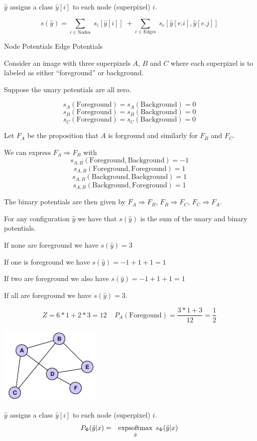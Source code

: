 {$\hat{y} $ assigns a class $\hat{y}[i]$ to each node (superpixel) $i$.


$$s(\hat{y}) = \sum_{i \in \mathrm{Nodes}}\; s_i[\hat{y}[i]]\; + \sum_{e \in \mathrm{Edges}}\;s_e[\hat{y}[e.i],\hat{y}[e.j]]$$

\vfill
\centerline{Node Potentials \hspace{4em}Edge Potentials}


Consider an image with three superpixels $A$, $B$ and $C$ where
each superpixel is to labeled as either ``foreground'' or background.

\vfill
Suppose the unary potentials are all zero.

\vfill
$$s_A(\mathrm{Foreground}) = s_A(\mathrm{Background}) = 0$$
$$s_B(\mathrm{Foreground}) = s_B(\mathrm{Background}) = 0$$
$$s_C(\mathrm{Foreground}) = s_C(\mathrm{Background}) = 0$$



\vfill
Let $F_A$ be the proposition that $A$ is forground and similarly for $F_B$ and $F_C$.

\vfill
We can express $F_A \Rightarrow F_B$ with
$$s_{A,B}(\mathrm{Foreground},\mathrm{Background}) = -1$$
$$s_{A,B}(\mathrm{Foreground},\mathrm{Foreground}) = 1$$
$$s_{A,B}(\mathrm{Background},\mathrm{Background}) = 1$$
$$s_{A,B}(\mathrm{Background},\mathrm{Foreground}) = 1$$

\vfill
The binary potentials are then given by
$F_A \Rightarrow F_B$, $F_B \Rightarrow F_C$, $F_C \Rightarrow F_A$.


For any configuration $\hat{y}$ we have that $s(\hat{y})$ is the sum of the unary and binary potentials.

\vfill
If none are foreground we have $s(\hat{y}) = 3$

\vfill
If one is foreground we have $s(\hat{y}) = -1 + 1+ 1 = 1$

\vfill
If two are foreground we also have $s(\hat{y}) = -1 + 1+ 1 = 1$

\vfill
If all are foreground we have $s(\hat{y}) = 3$.

\vfill
$$Z = 6*1 + 2*3 = 12\;\;\;\;P_A(\mathrm{Foregound}) = \frac{3*1 + 3}{12} = \frac{1}{2}$$

\bigskip
\centerline{\includegraphics[height= 1.5in]{../images/Graph}}
\medskip
$\hat{y} $ assigns a class $\hat{y}[i]$ to each node (superpixel) $i$.
\bigskip
\bigskip
{\color{red}
\begin{eqnarray*}
P_\Phi(\hat{y}|x) & = & \operatorname*{expsoftmax}_{\hat{y}}\;s_\Phi(\hat{y}|x)
\end{eqnarray*}
}

}

